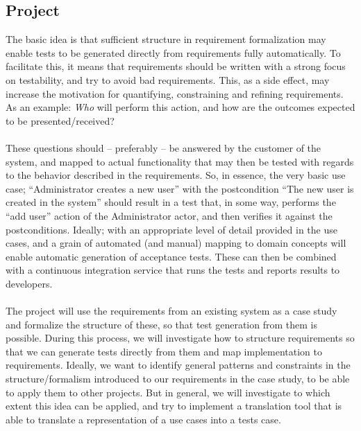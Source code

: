 \subsection{Project}
The basic idea is that sufficient structure in requirement formalization may enable tests to be generated directly from requirements fully automatically. To facilitate this, it means that requirements should be written with a strong focus on testability, and try to avoid bad requirements. This, as a side effect, may increase the motivation for quantifying, constraining and refining requirements. As an example: \emph{Who} will perform this action, and how are the outcomes expected to be presented/received?\\\\
These questions should -- preferably -- be answered by the customer of the system, and mapped to actual functionality that may then be tested with regards to the behavior described in the requirements. So, in essence, the very basic use case; ``Administrator creates a new user'' with the postcondition ``The new user is created in the system'' should result in a test that, in some way, performs the ``add user'' action of the Administrator actor, and then verifies it against the postconditions. Ideally; with an appropriate level of detail provided in the use cases, and a grain of automated (and manual) mapping to domain concepts will enable automatic generation of acceptance tests. These can then be combined with a continuous integration service that runs the tests and reports results to developers.\\\\
The project will use the requirements from an existing system as a case study and formalize the structure of these, so that test generation from them is possible. During this process, we will investigate how to structure requirements so that we can generate tests directly from them and map implementation to requirements. Ideally, we want to identify general patterns and constraints in the structure/formalism introduced to our requirements in the case study, to be able to apply them to other projects. But in general, we will investigate to which extent this idea can be applied, and try to implement a translation tool that is able to translate a representation of a use cases into a tests case.



